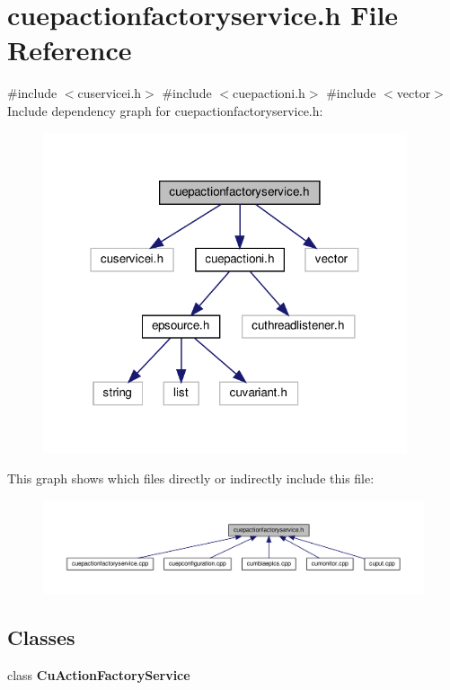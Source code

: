 \section{cuepactionfactoryservice.\+h File Reference}
\label{cuepactionfactoryservice_8h}
{\ttfamily \#include $<$cuservicei.\+h$>$}\newline
{\ttfamily \#include $<$cuepactioni.\+h$>$}\newline
{\ttfamily \#include $<$vector$>$}\newline
Include dependency graph for cuepactionfactoryservice.\+h\+:\nopagebreak
\begin{figure}[H]
\begin{center}
\leavevmode
\includegraphics[width=304pt]{cuepactionfactoryservice_8h__incl}
\end{center}
\end{figure}
This graph shows which files directly or indirectly include this file\+:\nopagebreak
\begin{figure}[H]
\begin{center}
\leavevmode
\includegraphics[width=350pt]{cuepactionfactoryservice_8h__dep__incl}
\end{center}
\end{figure}
\subsection*{Classes}
\begin{DoxyCompactItemize}
\item 
class \textbf{ Cu\+Action\+Factory\+Service}
\end{DoxyCompactItemize}
